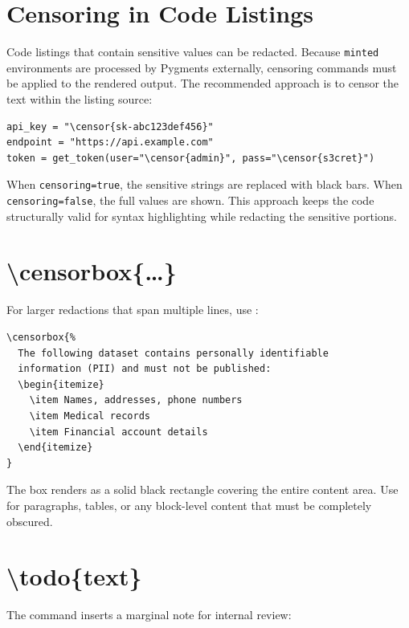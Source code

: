 \section{Censoring in Code Listings}

Code listings that contain sensitive values can be redacted.  Because
\texttt{minted} environments are processed by Pygments externally,
censoring commands must be applied to the rendered output.  The
recommended approach is to censor the text within the listing source:

\begin{verbatim}
api_key = "\censor{sk-abc123def456}"
endpoint = "https://api.example.com"
token = get_token(user="\censor{admin}", pass="\censor{s3cret}")
\end{verbatim}

When \texttt{censoring=true}, the sensitive strings are replaced with
black bars.  When \texttt{censoring=false}, the full values are shown.
This approach keeps the code structurally valid for syntax highlighting
while redacting the sensitive portions.

\section{\textbackslash censorbox\{\ldots\}}
\label{sec:censorbox}

For larger redactions that span multiple lines, use :

\begin{verbatim}
\censorbox{%
  The following dataset contains personally identifiable
  information (PII) and must not be published:
  \begin{itemize}
    \item Names, addresses, phone numbers
    \item Medical records
    \item Financial account details
  \end{itemize}
}
\end{verbatim}

The box renders as a solid black rectangle covering the entire content
area.  Use  for paragraphs, tables, or any block-level
content that must be completely obscured.

\section{\textbackslash todo\{text\}}

The  command inserts a marginal note for internal review:

